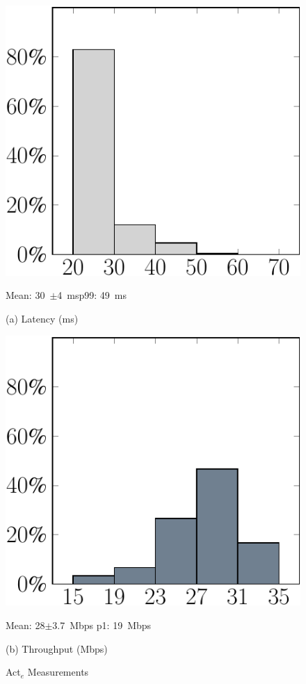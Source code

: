 \begin{figure}
\centering
\begin{minipage}[b]{0.49\linewidth}
\centering
\includegraphics[width=0.8\linewidth]{chapter5/FIGS/histo-acte-latency.pdf}\\
\begin{captext}
\centering
Mean: 30~$\pm$4~ms\hspace{0.1in}p99: 49~ms\\
\end{captext}
{\small (a) Latency (ms)}
\end{minipage}
\begin{minipage}[b]{0.49\linewidth}
\centering
\includegraphics[width=0.8\linewidth]{chapter5/FIGS/histo-acte-throughput.pdf}\\
\begin{captext}
\centering
Mean: 28$\pm$3.7~Mbps p1: 19~Mbps\\
\end{captext}
{\small (b) Throughput (Mbps)}
\end{minipage}
\caption{Act${_e}$ Measurements}
\label{fig:c2d-net}
\end{figure}

